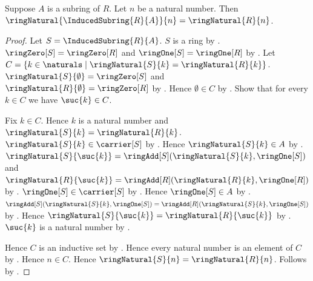 \begin{theorem}\label{induced_subring_natural_agreement}
    Suppose $A$ is a subring of $R$.
    Let $n$ be a natural number.
    Then $\ringNatural{\InducedSubring{R}{A}}{n}=\ringNatural{R}{n}$.
\end{theorem}
\begin{proof}
    Let $S=\InducedSubring{R}{A}$.
    $S$ is a ring by .
    $\ringZero[S]=\ringZero[R]$ and $\ringOne[S]=\ringOne[R]$ by
        .
    Let $C=\{k\in\naturals\mid
        \ringNatural{S}{k}=\ringNatural{R}{k}\}$.
    $\ringNatural{S}{\emptyset}=\ringZero[S]$ and
        $\ringNatural{R}{\emptyset}=\ringZero[R]$ by
        .
    Hence $\emptyset\in C$ by .
    Show that for every $k\in C$ we have $\suc{k}\in C$.
    \begin{subproof}
        Fix $k\in C$.
        Hence $k$ is a natural number and
            $\ringNatural{S}{k}=\ringNatural{R}{k}$.
        $\ringNatural{S}{k}\in\carrier[S]$ by .
        Hence $\ringNatural{S}{k}\in A$ by
            .
        $\ringNatural{S}{\suc{k}}
            =\ringAdd[S](\ringNatural{S}{k},\ringOne[S])$ and
            $\ringNatural{R}{\suc{k}}
            =\ringAdd[R](\ringNatural{R}{k},\ringOne[R])$ by
            .
        $\ringOne[S]\in\carrier[S]$ by .
        Hence $\ringOne[S]\in A$ by .
        $\ringAdd[S](\ringNatural{S}{k},\ringOne[S])
            =\ringAdd[R](\ringNatural{S}{k},\ringOne[S])$ by
            .
        Hence $\ringNatural{S}{\suc{k}}=\ringNatural{R}{\suc{k}}$ by
            \auto.
        $\suc{k}$ is a natural number by .
    \end{subproof}
    Hence $C$ is an inductive set by .
    Hence every natural number is an element of $C$ by
        .
    Hence $n\in C$.
    Hence $\ringNatural{S}{n}=\ringNatural{R}{n}$.
    Follows by \auto.
\end{proof}

